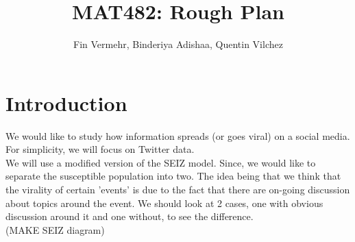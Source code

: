 \documentclass[11pt]{article}
\theoremstyle{plain}
\theoremstyle{definition}
\begin{document}
 


\title{MAT482: Rough Plan}
\author{Fin Vermehr, Binderiya Adishaa, Quentin Vilchez}
\maketitle

\section{Introduction}

We would like to study how information spreads (or goes viral) on a social media. \\
For simplicity, we will focus on Twitter data. \\
We will use a modified version of the SEIZ model. Since, we would like to separate the susceptible population into two. The idea being that we think that the virality of certain 'events' is due to the fact that there are on-going discussion about topics around the event. 
We should look at 2 cases, one with obvious discussion around it and one without, to see the difference.
\\(MAKE SEIZ diagram)
\end{document}
